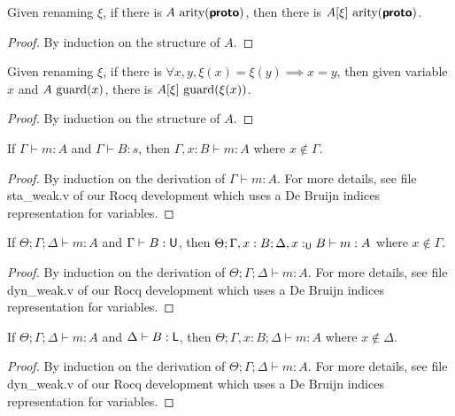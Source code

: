 \begin{lemma}
  Given renaming $\xi$, if there is $A~\text{arity}(\textbf{\textsf{proto}})$, then there is $A[\xi]~\text{arity}(\textbf{\textsf{proto}})$.
\end{lemma}
\begin{proof}
  By induction on the structure of $A$.
\end{proof}

\begin{lemma}
  Given renaming $\xi$, 
  if there is $\forall x, y, \xi(x) = \xi(y) \implies x = y$, 
  then given variable $x$ and $A~\text{guard}(x)$, there is $A[\xi]~\text{guard}(\xi(x))$.
\end{lemma}
\begin{proof}
  By induction on the structure of $A$.
\end{proof}

\begin{lemma}
  If $\Gamma \vdash m : A$ and $\Gamma \vdash B : s$, 
  then $\Gamma, x : B \vdash m : A$ where $x \not\in \Gamma$.
\end{lemma}
\begin{proof}
  By induction on the derivation of $\Gamma \vdash m : A$.
  For more details, see file \textsf{sta\_weak.v} of our Rocq development
  which uses a De Bruijn indices representation for variables.
\end{proof}

\begin{lemma}
  If $\Theta ; \Gamma ; \Delta \vdash m : A$ and $\Gamma \vdash B : \textsf{U}$,
  then $\Theta ; \Gamma, x : B ; \Delta, x :_{\textsf{U}} B \vdash m : A$ where $x \not\in \Gamma$.
\end{lemma}
\begin{proof}
  By induction on the derivation of $\Theta ; \Gamma ; \Delta \vdash m : A$.
  For more details, see file \textsf{dyn\_weak.v} of our Rocq development
  which uses a De Bruijn indices representation for variables.
\end{proof}

\begin{lemma}
  If $\Theta ; \Gamma ; \Delta \vdash m : A$ and $\Delta \vdash B : \textsf{L}$,
  then $\Theta ; \Gamma, x : B ; \Delta \vdash m : A$ where $x \not\in \Delta$.
\end{lemma}
\begin{proof}
  By induction on the derivation of $\Theta ; \Gamma ; \Delta \vdash m : A$.
  For more details, see file \textsf{dyn\_weak.v} of our Rocq development
  which uses a De Bruijn indices representation for variables.
\end{proof}
